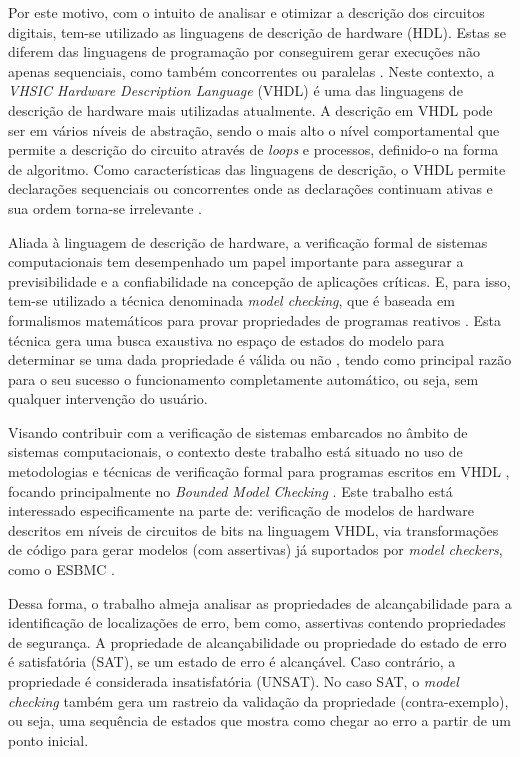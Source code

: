 \par
Por este motivo, com o intuito de analisar e otimizar a descrição dos circuitos digitais, tem-se utilizado as linguagens de descrição de hardware (HDL). Estas se diferem das linguagens de programação por conseguirem gerar execuções não apenas sequenciais, como também concorrentes ou paralelas \cite{chu2006rtl}.
% 
Neste contexto, a \textit{VHSIC Hardware Description Language} (VHDL) é uma das linguagens de descrição de hardware mais utilizadas atualmente. A descrição em VHDL pode ser em vários níveis de abstração, sendo o mais alto o nível comportamental que permite a descrição do circuito através de \textit{loops} e processos, definido-o na forma de algoritmo. Como características das linguagens de descrição, o VHDL permite declarações sequenciais ou concorrentes onde as declarações continuam ativas e sua ordem torna-se irrelevante \cite{cappelattipraticando}.

\par
Aliada à linguagem de descrição de hardware, a  verificação formal de sistemas computacionais tem desempenhado um papel importante para assegurar a previsibilidade e a confiabilidade na concepção de aplicações críticas. E, para isso, tem-se utilizado a técnica denominada \textit{model checking}, que é baseada em formalismos matemáticos para provar propriedades de programas reativos \cite{bensalem1999automatic}. Esta técnica gera uma busca exaustiva no espaço de estados do modelo para determinar se uma dada propriedade é válida ou não \cite{baier2008principles}, tendo como principal razão para o seu sucesso o funcionamento completamente automático, ou seja, sem qualquer intervenção do usuário.

\par
Visando contribuir com a verificação de sistemas embarcados no âmbito de sistemas computacionais, o contexto deste trabalho está situado no uso de metodologias e técnicas de verificação formal para programas escritos em VHDL \cite{biere2016aiger}, focando principalmente no \textit{Bounded Model Checking} \cite{cordeiro2012smt,rocha2015model}. Este trabalho está interessado especificamente na parte de: verificação de modelos de hardware descritos em níveis de circuitos de bits na linguagem VHDL, via transformações de código para gerar modelos (com assertivas) já suportados por \textit{model checkers}, como o ESBMC \cite{cordeiro2012smt}. 

\par
Dessa forma, o trabalho almeja analisar as propriedades de alcançabilidade para a identificação de localizações de erro, bem como, assertivas contendo propriedades de segurança. A propriedade de alcançabilidade ou propriedade do estado de erro é satisfatória (SAT), se um estado de erro é alcançável. Caso contrário, a propriedade é considerada insatisfatória (UNSAT). No caso SAT, o \textit{model checking} também gera um rastreio da validação da propriedade (contra-exemplo), ou seja, uma sequência de estados que mostra como chegar ao erro a partir de um ponto inicial.

